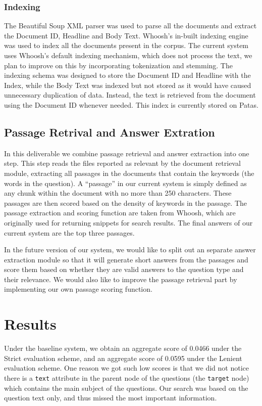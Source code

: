 \documentclass[11pt]{article}
\begin{document}
\subsubsection{Indexing}
The Beautiful Soup XML parser \cite{bsoup} was used to parse all the documents and extract the Document ID, Headline and Body Text. Whoosh's in-built indexing engine was used to index all the documents present in the corpus. The current system uses Whoosh's default indexing mechanism, which does not process the text, we plan to improve on this by incorporating tokenization and stemming. The indexing schema was designed to store the Document ID and Headline with the Index, while the Body Text was indexed but not stored as it would have caused unnecessary duplication of data. Instead, the text is retrieved from the document using the Document ID whenever needed. This index is currently stored on Patas.

\subsection{Passage Retrival and Answer Extration}
In this deliverable we combine passage retrieval and answer extraction into one step. This step reads the files reported as relevant by the document retrieval module, extracting all passages in the documents that contain the keywords (the words in the question). A ``passage'' in our current system is simply defined as any chunk within the document with no more than 250 characters. These passages are then scored based on the density of keywords in the passage. The passage extraction and scoring function are taken from Whoosh, which are originally used for returning snippets for search results. The final answers of our current system are the top three passages.

In the future version of our system, we would like to split out an separate answer extraction module so that it will generate short answers from the passages and score them based on whether they are valid answers to the question type and their relevance. We would also like to improve the passage retrieval part by implementing our own passage scoring function.

\section{Results}

Under the baseline system, we obtain an aggregate score of 0.0466 under the Strict evaluation scheme, and an aggregate score of 0.0595 under the Lenient evaluation scheme.
One reason we got such low scores is that we did not notice there is a \texttt{text} attribute in the parent node of the questions (the \texttt{target} node) which contains the main subject of the questions. Our search was based on the question text only, and thus missed the most important information.
\end{document}
